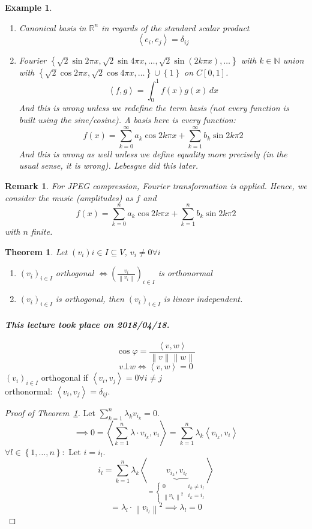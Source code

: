 \documentclass{article}
\newtheorem{theorem}{Theorem}  \numberwithin{theorem}{section}
\newtheorem{example}{Example}  \numberwithin{example}{section}
\newtheorem{remark}{Remark}  \numberwithin{remark}{section}
\newcommand{\set}[1]{\left\{#1\right\}}
\newcommand{\ip}[2]{\left\langle#1,#2\right\rangle} %
\newcommand{\angel}[1]{\left\langle#1\right\rangle}
\newcommand{\norm}[1]{\left\|#1\right\|}
\newcommand{\dateref}[1]{\paragraph{\textit{This lecture took place on #1.}}}
\begin{document}
\begin{example} %
  \begin{enumerate}
    \item Canonical basis in $\mathbb R^n$ in regards of the standard scalar product
      \[ \ip{e_i}{e_j} = \delta_{ij} \]
    \item Fourier $\set{\sqrt 2 \sin{2\pi x}, \sqrt2 \sin{4\pi x}, \ldots, \sqrt2 \sin(2k \pi x), \ldots}$ with $k \in \mathbb N$
      union with $\set{\sqrt2 \cos{2\pi x}, \sqrt2 \cos{4\pi x}, \ldots} \cup \set{\mathfrak 1}$
      on $C[0,1]$.
      \[ \ip fg = \int_0^1 f(x) g(x) \, dx \]
      And this is wrong unless we redefine the term basis (not every function is built using the sine/cosine).
      A basis here is every function:
      \[ f(x) = \sum_{k=0}^\infty a_k \cos{2k \pi x} + \sum_{k=1}^\infty b_k \sin{2k \pi 2} \]
      And this is wrong as well unless we define equality more precisely (in the usual sense, it is wrong).
      Lebesgue did this later.
  \end{enumerate}
\end{example}

\begin{remark}
  For JPEG compression, Fourier transformation is applied. Hence, we consider
  the music (amplitudes) as $f$ and
  \[ f(x) = \sum_{k=0}^n a_k \cos{2k \pi x} + \sum_{k=1}^n b_k \sin{2k \pi 2} \]
  with $n$ finite.
\end{remark}

\begin{theorem} %
  \label{thm838}
  Let $(v_i){i \in I} \subseteq V$, $v_i \neq 0 \forall i$
  \begin{enumerate}
    \item $(v_i)_{i \in I}$ orthogonal $\iff \left(\frac{v_i}{\norm{v_i}}\right)_{i \in I}$ is orthonormal
    \item $(v_i)_{i \in I}$ is orthogonal, then $(v_i)_{i \in I}$ is linear independent.
  \end{enumerate}
\end{theorem}

\dateref{2018/04/18}

\[ \cos\varphi = \frac{\ip vw}{\norm{v} \norm{w}} \]
\[ v \bot w \iff \ip vw = 0 \]
$(v_i)_{i \in I}$ orthogonal if $\ip{v_i}{v_j} = 0 \forall i \neq j$ \\
orthonormal: $\ip{v_i}{v_j} = \delta_{ij}$.

\begin{proof}[Proof of Theorem~\ref{thm838}]
  Let $\sum_{k=1}^n \lambda_k v_{i_k} = 0$.
  \[ \implies 0 = \angel{\sum_{k=1}^n \lambda \cdot v_{i_k}, v_i} = \sum_{k=1}^n \lambda_k \angel{v_{i_k}, v_i} \]
  $\forall l \in \set{1, \ldots, n}:$ Let $i = i_l$.
  \[ i_l = \sum_{k=1}^n \lambda_k \angel{\underbrace{v_{i_k}, v_{i_l}}_{= \begin{cases} 0 & i_k \neq i_l \\ \norm{v_{i_l}}^2 & i_k = i_l \end{cases}} } \]
  \[ = \lambda_l \cdot \norm{v_{i_l}}^2 \implies \lambda_l = 0 \]
\end{proof}
\end{document}
